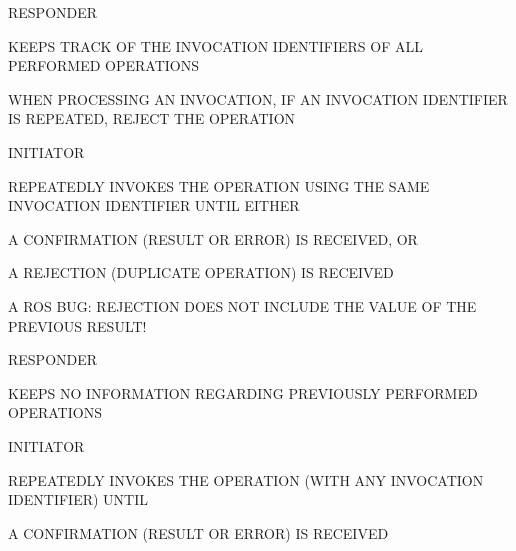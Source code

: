 \begin{bwslide}

\begin{nrtc}
\item	RESPONDER
    \begin{nrtc}
    \item	KEEPS TRACK OF THE INVOCATION IDENTIFIERS OF ALL PERFORMED
		OPERATIONS

    \item	WHEN PROCESSING AN INVOCATION, IF AN INVOCATION IDENTIFIER IS
		REPEATED, REJECT THE OPERATION 
    \end{nrtc}

\item	INITIATOR
    \begin{nrtc}
    \item	REPEATEDLY INVOKES THE OPERATION USING THE SAME INVOCATION
		IDENTIFIER UNTIL EITHER

    \item	A CONFIRMATION (RESULT OR ERROR) IS RECEIVED, OR

    \item	A REJECTION (DUPLICATE OPERATION) IS RECEIVED
    \end{nrtc}

\item	A ROS BUG: REJECTION DOES NOT INCLUDE THE VALUE OF THE PREVIOUS RESULT!
\end{nrtc}
\end{bwslide}


\begin{bwslide}

\begin{nrtc}
\item	RESPONDER
    \begin{nrtc}
    \item	KEEPS NO INFORMATION REGARDING PREVIOUSLY PERFORMED OPERATIONS
    \end{nrtc}

\item	INITIATOR
    \begin{nrtc}
    \item	REPEATEDLY INVOKES THE OPERATION (WITH ANY INVOCATION
		IDENTIFIER) UNTIL

    \item	A CONFIRMATION (RESULT OR ERROR) IS RECEIVED
    \end{nrtc}
\end{nrtc}
\end{bwslide}


